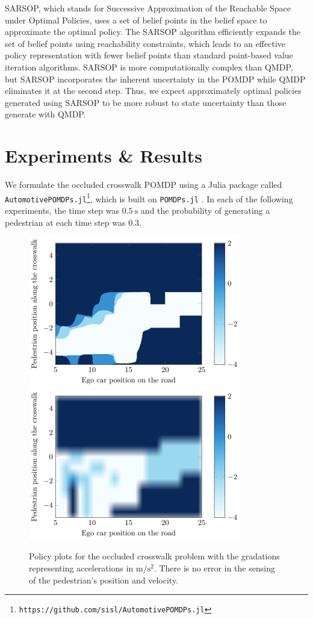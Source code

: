 \documentclass[conference]{IEEEtran}
\begin{document}
SARSOP, which stands for Successive Approximation of the Reachable Space under Optimal Policies, uses a set of belief points in the belief space to approximate the optimal policy. The SARSOP algorithm efficiently expands the set of belief points using reachability constraints, which leads to an effective policy representation with fewer belief points than standard point-based value iteration algorithms. SARSOP is more computationally complex than QMDP, but SARSOP incorporates the inherent uncertainty in the POMDP while QMDP eliminates it at the second step. Thus, we expect approximately optimal policies generated using SARSOP to be more robust to state uncertainty than those generate with QMDP.


\section{Experiments \& Results}
\label{sec:experiments-results}

We formulate the occluded crosswalk POMDP using a Julia package called \texttt{AutomotivePOMDPs.jl}\footnote{\texttt{https://github.com/sisl/AutomotivePOMDPs.jl}}, which is built on \texttt{POMDPs.jl} \cite{Egorov2017POMDPs.jl:Uncertainty}. In each of the following experiments, the time step was $0.5 ~\si{\second}$ and the probability of generating a pedestrian at each time step was $0.3$.

\begin{figure}[tbph]
    \centerline{
        \includegraphics[width=0.5\linewidth]{src/plots/qmdp_0_00001_noise_0_01.png}
        \includegraphics[width=0.5\linewidth]{src/plots/sarsop_0_01_1000_noise_0_01.png}
    }
    \caption{Policy plots for the occluded crosswalk problem with the gradations representing accelerations in $\si{\meter\per\square\second}$. There is no error in the sensing of the pedestrian's position and velocity.}
    \label{fig:qmdp_sarsop_1}
\end{figure}
\end{document}
